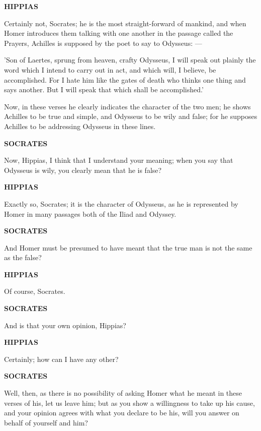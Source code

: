 \documentclass[11pt,letter]{article}
\begin{document}
\par \textbf{HIPPIAS}
\par   Certainly not, Socrates; he is the most straight-forward of mankind, and when Homer introduces them talking with one another in the passage called the Prayers, Achilles is supposed by the poet to say to Odysseus: —

\par  'Son of Laertes, sprung from heaven, crafty Odysseus, I will speak out plainly the word which I intend to carry out in act, and which will, I believe, be accomplished. For I hate him like the gates of death who thinks one thing and says another. But I will speak that which shall be accomplished.'

\par  Now, in these verses he clearly indicates the character of the two men; he shows Achilles to be true and simple, and Odysseus to be wily and false; for he supposes Achilles to be addressing Odysseus in these lines.

\par \textbf{SOCRATES}
\par   Now, Hippias, I think that I understand your meaning; when you say that Odysseus is wily, you clearly mean that he is false?

\par \textbf{HIPPIAS}
\par   Exactly so, Socrates; it is the character of Odysseus, as he is represented by Homer in many passages both of the Iliad and Odyssey.

\par \textbf{SOCRATES}
\par   And Homer must be presumed to have meant that the true man is not the same as the false?

\par \textbf{HIPPIAS}
\par   Of course, Socrates.

\par \textbf{SOCRATES}
\par   And is that your own opinion, Hippias?

\par \textbf{HIPPIAS}
\par   Certainly; how can I have any other?

\par \textbf{SOCRATES}
\par   Well, then, as there is no possibility of asking Homer what he meant in these verses of his, let us leave him; but as you show a willingness to take up his cause, and your opinion agrees with what you declare to be his, will you answer on behalf of yourself and him?
\end{document}
